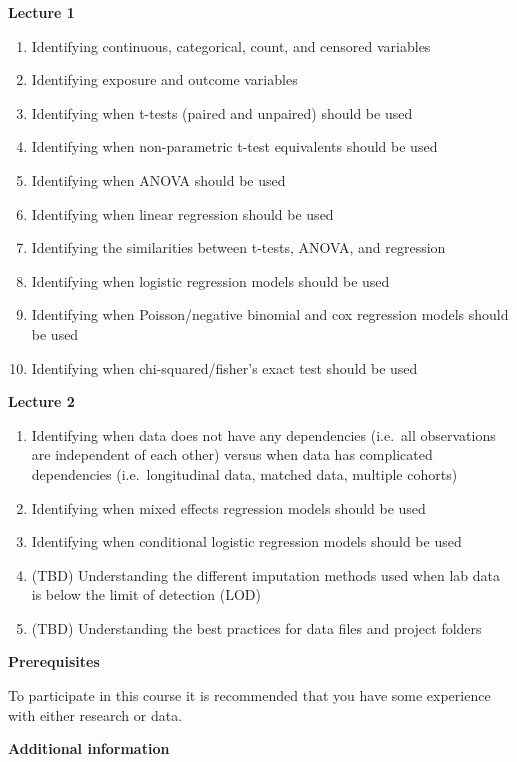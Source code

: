\documentclass[]{book}
\providecommand{\tightlist}{%
  \setlength{\itemsep}{0pt}\setlength{\parskip}{0pt}}
\begin{document}
\textbf{Lecture 1}

\begin{enumerate}
\def\labelenumi{\arabic{enumi}.}
\tightlist
\item
  Identifying continuous, categorical, count, and censored variables
\item
  Identifying exposure and outcome variables
\item
  Identifying when t-tests (paired and unpaired) should be used
\item
  Identifying when non-parametric t-test equivalents should be used
\item
  Identifying when ANOVA should be used
\item
  Identifying when linear regression should be used
\item
  Identifying the similarities between t-tests, ANOVA, and regression
\item
  Identifying when logistic regression models should be used
\item
  Identifying when Poisson/negative binomial and cox regression models
  should be used
\item
  Identifying when chi-squared/fisher's exact test should be used
\end{enumerate}

\textbf{Lecture 2}

\begin{enumerate}
\def\labelenumi{\arabic{enumi}.}
\tightlist
\item
  Identifying when data does not have any dependencies (i.e.~all
  observations are independent of each other) versus when data has
  complicated dependencies (i.e.~longitudinal data, matched data,
  multiple cohorts)
\item
  Identifying when mixed effects regression models should be used
\item
  Identifying when conditional logistic regression models should be used
\item
  (TBD) Understanding the different imputation methods used when lab
  data is below the limit of detection (LOD)
\item
  (TBD) Understanding the best practices for data files and project
  folders
\end{enumerate}

\textbf{Prerequisites}

To participate in this course it is recommended that you have some
experience with either research or data.

\textbf{Additional information}
\end{document}
